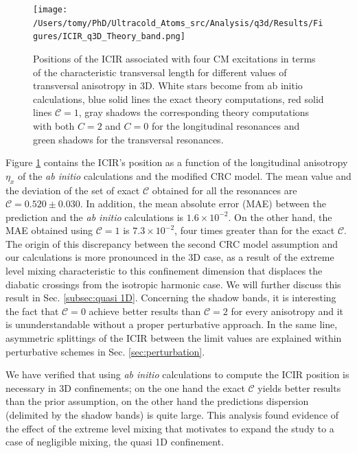 \documentclass[aps,pre,twocolumn,superscriptaddress,showpacs]{revtex4-1}
\begin{document}
\begin{figure}[htbp!]
 \centering
\texttt{[image: /Users/tomy/PhD/Ultracold\_Atoms\_src/Analysis/q3d/Results/Figures/ICIR\_q3D\_Theory\_band.png]}
 \caption{Positions of the ICIR associated with four CM excitations in terms of the characteristic transversal length for different values of transversal anisotropy in 3D. White stars become from ab initio calculations, blue solid lines the exact theory computations, red solid lines $\mathcal{C}=1$, gray shadows the corresponding theory computations with both $C=2$ and $C=0$ for the longitudinal resonances and green shadows for the transversal resonances. }
 \label{fig:q3d ICIR}
 \end{figure}

Figure \ref{fig:q3d ICIR} contains the ICIR's position as a function of the longitudinal anisotropy $\eta_x$ of the \textit{ab initio} calculations and the modified CRC model. The mean value and the deviation of the set of exact $\mathcal{C}$ obtained for all the resonances are $\mathcal{C} = 0.520 \pm 0.030$. In addition, the mean absolute error (MAE) between the prediction and the \textit{ab initio} calculations is $1.6 \times 10^{-2}$. On the other hand, the MAE obtained using $\mathcal{C} = 1$ is $7.3 \times 10^{-2}$, four times greater than for the exact $\mathcal{C}$.  The origin of this discrepancy between the second CRC model assumption and our calculations is more pronounced in the 3D case, as a result of the extreme level mixing characteristic to this confinement dimension that displaces the diabatic crossings from the isotropic harmonic case. We will further discuss this result in Sec. \ref{subsec:quasi 1D}.  Concerning the shadow bands, it is interesting the fact that $\mathcal{C} = 0$ achieve better results than $\mathcal{C}=2$ for every anisotropy and it is ununderstandable without a proper perturbative approach. In the same line, asymmetric splittings of the ICIR between the limit values are explained within perturbative schemes in Sec. \ref{sec:perturbation}. 
		 
We have verified that using \textit{ab initio} calculations to compute the ICIR position is necessary in 3D confinements; on the one hand the exact $\mathcal{C}$ yields better results than the prior assumption, on the other hand the predictions dispersion (delimited by the shadow bands) is quite large. This analysis found evidence of the effect of the extreme level mixing that motivates to expand the study to a case of negligible mixing, the quasi 1D confinement.
\end{document}
